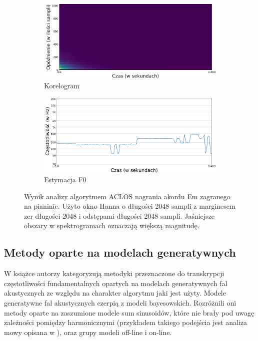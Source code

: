 \documentclass[12pt,a4paper,twoside]{mwart}
\begin{document}
\begin{figure}[H]
  \begin{subfigure}{0.5\textwidth}
    \includegraphics[width=1.\linewidth]{images/Em/Aclos_corelogram_cropped.png}
    \caption{Korelogram}
  \end{subfigure}
  \begin{subfigure}{0.49\textwidth}
    \includegraphics[width=1.\linewidth]{images/Em/Aclos_estymacja_cropped.png}
    \caption{Estymacja F0}
    \label{fig:multi:aclos:estimation}
  \end{subfigure}
  \caption{Wynik analizy algorytmem ACLOS nagrania akordu Em zagranego na pianinie. Użyto okno Hanna o długości 2048 sampli z marginesem zer długości 2048 i odstępami długości 2048 sampli. Jaśniejsze obszary w spektrogramach oznaczają większą magnitudę.}
  \label{fig:multi:aclos}
\end{figure}

\subsection{Metody oparte na modelach generatywnych}
W książce 
\cite[203-227]{Transcription:Anssi:SignalProcessingMethods}
autorzy kategoryzują metodyki przeznaczone do transkrypcji częstotliwości fundamentalnych opartych na modelach generatywnych fal akustycznych ze względu na charakter algorytmu jaki jest użyty. Modele generatywne fal akustycznych czerpią z modeli bayesowskich. Rozróżnili oni metody oparte na zaszumione modele sum sinusoidów, które nie brały pod uwagę zależności pomiędzy harmonicznymi (przykładem takiego podejścia jest analiza mowy opisana w 
\cite[744-745]{Transcription:McAulay:SinusoidalRepresentationF0}
), oraz grupy modeli off-line i on-line.
\end{document}
